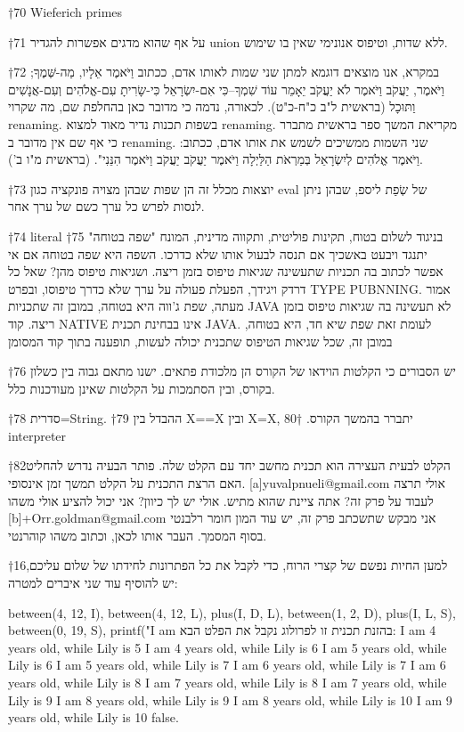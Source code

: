 \begin{טבלא}[!htbp]
†{70} Wieferich primes

†{71} על אף שהוא מדגים אפשרות להגדיר union ללא שדות, וטיפוס אנונימי שאין בו שימוש.

†{72} במקרא, אנו מוצאים דוגמא למתן שני שמות לאותו אדם, ככתוב וַיֹּאמֶר אֵלָיו, מַה-שְּׁמֶךָ; וַיֹּאמֶר, יַעֲקֹב וַיֹּאמֶר לֹא יַעֲקֹב יֵאָמֵר עוֹד שִׁמְךָ--כִּי אִם-יִשְׂרָאֵל כִּי-שָׂרִיתָ עִם-אֱלֹהִים וְעִם-אֲנָשִׁים וַתּוּכָל (בראשית ל"ב כ"ח-כ"ט). לכאורה, נדמה כי מדובר כאן בהחלפת שם, מה שקרוי renaming. בשפות תכנות נדיר מאוד למצוא renaming. מקריאת המשך ספר בראשית מתברר כי אף שם אין מדובר ב renaming. שני השמות ממשיכים לשמש את אותו אדם, ככתוב: וַיֹּאמֶר אֱלֹהִים לְיִשְׂרָאֵל בְּמַרְאֹת הַלַּיְלָה וַיֹּאמֶר יַעֲקֹב יַעֲקֹב וַיֹּאמֶר הִנֵּנִי". (בראשית מ"ו ב').

†{73} יוצאות מכלל זה הן שפות שבהן מצויה פונקציה כגון eval של שְׂפַת ליספ, שבהן ניתן לנסות לפרש כל ערך כשם של ערך אחר.

†{74} literal
†{75} בניגוד לשלום בטוח, תקינות פוליטית, ותקווה מדינית, המונח "שפה בטוחה" יתנגד ויבעט באשכיך אם תנסה לבעול אותו שלא כדרכו. השפה היא שפה בטוחה אם אי אפשר לכתוב בה תכניות שתעשינה שגיאות טיפוס בזמן ריצה. ושגיאות טיפוס מהן? שאל כל דרדק ויגידך, הפעלת פעולה על ערך שלא כדרך טיפוסו, ובפרט TYPE PUBNNING. אמור מעתה, שפת ג'ווה היא בטוחה, במובן זה שתכניות JAVA לא תעשינה בה שגיאות טיפוס בזמן ריצה. קוד NATIVE אינו בבחינת תכנית JAVA. לעומת זאת שפת שיא חד, היא בטוחה, במובן זה, שכל שגיאות הטיפוס שתכנית יכולה לעשות, תופענה בתוך קוד המסומן

†{76} יש הסבורים כי הקלטות הוידאו של הקורס הן מלכודת פתאים. ישנו מתאם גבוה בין כשלון בקורס, ובין הסתמכות על הקלטות שאינן מעודכנות כלל.

†{78} סדרית=String.
†{79} ההבדל בין X==X ובין X=X, יתברר בהמשך הקורס.
†{80} interpreter

†{82}הקלט לבעית העצירה הוא תכנית מחשב יחד עם הקלט שלה. פותר הבעיה נדרש להחליט האם הרצת התכנית על הקלט תמשך זמן אינסופי. [a]yuvalpnueli@gmail.com אולי תרצה לעבוד על פרק זה? אתה ציינת שהוא מתיש. אולי יש לך כיוון? אני יכול להציע אולי משהו [b]+Orr.goldman@gmail.com אני מבקש שתשכתב פרק זה, יש עוד המון חומר רלבנטי בסוף המסמך. העבר אותו לכאן, וכתוב משהו קוהרנטי.

†{16}למען החיות נפשם של קצרי הרוח, כדי לקבל את כל הפתרונות לחידתו של שלום עליכם, יש להוסיף עוד שני איברים למטרה:

        between(4, 12, I), between(4, 12, L),
        plus(I, D, L), between(1, 2, D), plus(I, L, S), between(0, 19, S),
        printf("I am %
        בהזנת תכנית זו לפרולוג נקבל את הפלט הבא:
        I am 4 years old, while Lily is 5
        I am 4 years old, while Lily is 6
        I am 5 years old, while Lily is 6
        I am 5 years old, while Lily is 7
        I am 6 years old, while Lily is 7
        I am 6 years old, while Lily is 8
        I am 7 years old, while Lily is 8
        I am 7 years old, while Lily is 9
        I am 8 years old, while Lily is 9
        I am 8 years old, while Lily is 10
        I am 9 years old, while Lily is 10
        false.


\end{טבלא}
